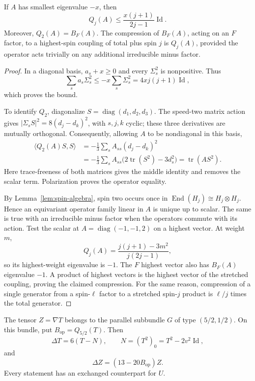 \begin{lemma}
\label{lem:quadratic-curvature-action}
If $A$ has smallest eigenvalue $-x$, then
\[
 Q_j(A)\le \frac{x(j+1)}{2j-1}\operatorname{Id}.
\]
Moreover, $Q_2(A)=B_F(A)$. The compression of $B_F(A)$, acting on an
$F$ factor, to a highest-spin coupling of total plus spin $j$ is
$Q_j(A)$, provided the operator acts trivially on any additional
irreducible minus factor.
\end{lemma}

\begin{proof}
In a diagonal basis, $a_s+x\ge0$ and every $\Sigma_s^2$ is
nonpositive. Thus
\[
 \sum_s a_s\Sigma_s^2
 \le -x\sum_s\Sigma_s^2
 =4xj(j+1)\operatorname{Id},
\]
which proves the bound.

To identify $Q_2$, diagonalize $S=\operatorname{diag}(d_1,d_2,d_3)$.
The speed-two matrix action gives
$|\Sigma_sS|^2=8(d_j-d_k)^2$, with $s,j,k$ cyclic; these three
derivatives are mutually orthogonal. Consequently, allowing $A$
to be nondiagonal in this basis,
\[
 \begin{aligned}
 \langle Q_2(A)S,S\rangle
 &=-\frac13\sum_s A_{ss}(d_j-d_k)^2\\
 &=-\frac13\sum_s A_{ss}
       \bigl(2\operatorname{tr}(S^2)-3d_s^2\bigr)
 =\operatorname{tr}(AS^2).
 \end{aligned}
\]
Here trace-freeness of both matrices gives the middle identity and
removes the scalar term. Polarization proves the operator equality.

By Lemma~\ref{lem:spin-algebra}, spin two occurs once in
$\operatorname{End}(H_j)\cong H_j\otimes H_j$. Hence an equivariant
operator family linear in $A$ is unique up to scalar. The same is
true with an irreducible minus factor when the operators commute
with its action. Test the scalar at
$A=\operatorname{diag}(-1,-1,2)$ on a highest vector. At weight $m$,
\[
 Q_j(A)=\frac{j(j+1)-3m^2}{j(2j-1)},
\]
so its highest-weight eigenvalue is $-1$. The $F$ highest vector
also has $B_F(A)$ eigenvalue $-1$. A product of highest vectors is
the highest vector of the stretched coupling, proving the claimed
compression. For the same reason, compression of a single generator
from a spin-$\ell$ factor to a stretched spin-$j$ product is
$\ell/j$ times the total generator.
\end{proof}

\begin{proposition}
\label{prop:weyl-derivative-equations}
The tensor $Z=\nabla T$ belongs to the parallel subbundle
$G$ of type $(5/2,1/2)$. On this bundle, put
$B_{\mathrm{op}}=Q_{5/2}(T)$. Then
\[
 \Delta T=6(T-N),\qquad
 N=(T^2)_0=T^2-2v^2\operatorname{Id},
\]
and
\begin{equation}
 \Delta Z=(13-20B_{\mathrm{op}})Z.
 \tag{1}\label{eq:1}
\end{equation}
Every statement has an exchanged counterpart for $U$.
\end{proposition}

